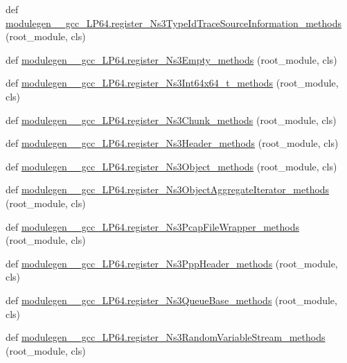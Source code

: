 \begin{DoxyCompactItemize}
\item 
def \hyperlink{namespacemodulegen____gcc__LP64_af7ee3e03193815233627c2c4b4b2ebf6}{modulegen\+\_\+\+\_\+gcc\+\_\+\+L\+P64.\+register\+\_\+\+Ns3\+Type\+Id\+Trace\+Source\+Information\+\_\+methods} (root\+\_\+module, cls)
\item 
def \hyperlink{namespacemodulegen____gcc__LP64_af245edb84966d4b4c48221a31647be89}{modulegen\+\_\+\+\_\+gcc\+\_\+\+L\+P64.\+register\+\_\+\+Ns3\+Empty\+\_\+methods} (root\+\_\+module, cls)
\item 
def \hyperlink{namespacemodulegen____gcc__LP64_a1239c8a15c3a5d5ac5184bd53add8029}{modulegen\+\_\+\+\_\+gcc\+\_\+\+L\+P64.\+register\+\_\+\+Ns3\+Int64x64\+\_\+t\+\_\+methods} (root\+\_\+module, cls)
\item 
def \hyperlink{namespacemodulegen____gcc__LP64_ad963bb0d3bc0910b7d8b5a1818803799}{modulegen\+\_\+\+\_\+gcc\+\_\+\+L\+P64.\+register\+\_\+\+Ns3\+Chunk\+\_\+methods} (root\+\_\+module, cls)
\item 
def \hyperlink{namespacemodulegen____gcc__LP64_a3c6ef29ba074be124c68037155fe7cbe}{modulegen\+\_\+\+\_\+gcc\+\_\+\+L\+P64.\+register\+\_\+\+Ns3\+Header\+\_\+methods} (root\+\_\+module, cls)
\item 
def \hyperlink{namespacemodulegen____gcc__LP64_a37449428b6bb64d5e534ebe801291a86}{modulegen\+\_\+\+\_\+gcc\+\_\+\+L\+P64.\+register\+\_\+\+Ns3\+Object\+\_\+methods} (root\+\_\+module, cls)
\item 
def \hyperlink{namespacemodulegen____gcc__LP64_ab66e5c7d4bfc0a0524b69d37ef0bbb53}{modulegen\+\_\+\+\_\+gcc\+\_\+\+L\+P64.\+register\+\_\+\+Ns3\+Object\+Aggregate\+Iterator\+\_\+methods} (root\+\_\+module, cls)
\item 
def \hyperlink{namespacemodulegen____gcc__LP64_a333d484ddac696518d332cdfb4744ca8}{modulegen\+\_\+\+\_\+gcc\+\_\+\+L\+P64.\+register\+\_\+\+Ns3\+Pcap\+File\+Wrapper\+\_\+methods} (root\+\_\+module, cls)
\item 
def \hyperlink{namespacemodulegen____gcc__LP64_a61f7c834d611f24cf077888297f647d1}{modulegen\+\_\+\+\_\+gcc\+\_\+\+L\+P64.\+register\+\_\+\+Ns3\+Ppp\+Header\+\_\+methods} (root\+\_\+module, cls)
\item 
def \hyperlink{namespacemodulegen____gcc__LP64_a0a2f03d49505fa8a44248392f6ebd42c}{modulegen\+\_\+\+\_\+gcc\+\_\+\+L\+P64.\+register\+\_\+\+Ns3\+Queue\+Base\+\_\+methods} (root\+\_\+module, cls)
\item 
def \hyperlink{namespacemodulegen____gcc__LP64_a8b671930ca330fd0dced5e07fc408a71}{modulegen\+\_\+\+\_\+gcc\+\_\+\+L\+P64.\+register\+\_\+\+Ns3\+Random\+Variable\+Stream\+\_\+methods} (root\+\_\+module, cls)

\end{DoxyCompactItemize}
